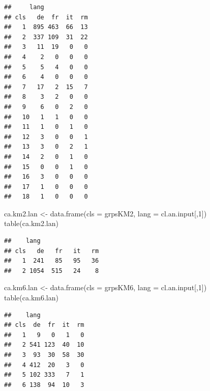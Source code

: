 \documentclass[
]{article}
\newenvironment{Shaded}{\begin{snugshade}}{\end{snugshade}}
\newcommand{\AttributeTok}[1]{\textcolor[rgb]{0.77,0.63,0.00}{#1}}
\newcommand{\DecValTok}[1]{\textcolor[rgb]{0.00,0.00,0.81}{#1}}
\newcommand{\FunctionTok}[1]{\textcolor[rgb]{0.00,0.00,0.00}{#1}}
\newcommand{\NormalTok}[1]{#1}
\newcommand{\OtherTok}[1]{\textcolor[rgb]{0.56,0.35,0.01}{#1}}
\newcommand{\SpecialCharTok}[1]{\textcolor[rgb]{0.00,0.00,0.00}{#1}}
\begin{document}
\begin{verbatim}
##     lang
## cls   de  fr  it  rm
##   1  895 463  66  13
##   2  337 109  31  22
##   3   11  19   0   0
##   4    2   0   0   0
##   5    5   4   0   0
##   6    4   0   0   0
##   7   17   2  15   7
##   8    3   2   0   0
##   9    6   0   2   0
##   10   1   1   0   0
##   11   1   0   1   0
##   12   3   0   0   1
##   13   3   0   2   1
##   14   2   0   1   0
##   15   0   0   1   0
##   16   3   0   0   0
##   17   1   0   0   0
##   18   1   0   0   0
\end{verbatim}

\begin{Shaded}
\begin{Highlighting}[]
\NormalTok{ca.km2.lan }\OtherTok{\textless{}{-}} \FunctionTok{data.frame}\NormalTok{(}\AttributeTok{cls =}\NormalTok{ grpsKM2, }\AttributeTok{lang =}\NormalTok{ cl.an.input[,}\DecValTok{1}\NormalTok{])}
\FunctionTok{table}\NormalTok{(ca.km2.lan)}
\end{Highlighting}
\end{Shaded}

\begin{verbatim}
##    lang
## cls   de   fr   it   rm
##   1  241   85   95   36
##   2 1054  515   24    8
\end{verbatim}

\begin{Shaded}
\begin{Highlighting}[]
\NormalTok{ca.km6.lan }\OtherTok{\textless{}{-}} \FunctionTok{data.frame}\NormalTok{(}\AttributeTok{cls =}\NormalTok{ grpsKM6, }\AttributeTok{lang =}\NormalTok{ cl.an.input[,}\DecValTok{1}\NormalTok{])}
\FunctionTok{table}\NormalTok{(ca.km6.lan)}
\end{Highlighting}
\end{Shaded}

\begin{verbatim}
##    lang
## cls  de  fr  it  rm
##   1   9   0   1   0
##   2 541 123  40  10
##   3  93  30  58  30
##   4 412  20   3   0
##   5 102 333   7   1
##   6 138  94  10   3
\end{verbatim}

\begin{Shaded}
\end{Shaded}
\end{document}
